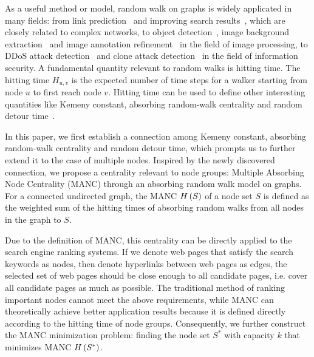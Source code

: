 \documentclass[sigconf]{acmart}
\begin{document}
As a useful method or model, random walk on graphs is widely applicated in many fields: from link prediction~\cite{YiGuWeTiHa10} and improving search results~\cite{LiPeMaQiWeQi10}, which are closely related to complex networks, to object detection~\cite{GoViHuRa10}, image background extraction~\cite{HuWaYeChLa16} and image annotation refinement~\cite{WaJiZhZh10} in the field of image processing, to DDoS attack detection~\cite{XuZhXiYu14} and clone attack detection~\cite{ZeCaZhGuXi10} in the field of information security.
A fundamental quantity relevant to random walks is hitting time.
The hitting time \(H_{u,v}\) is the expected number of time steps for a walker starting from node \(u\) to first reach node \(v\).
Hitting time can be used to define other interesting quantities like Kemeny constant, absorbing random-walk centrality and random detour time~\cite{RaZh13}.

In this paper, we first establish a connection among Kemeny constant, absorbing random-walk centrality and random detour time, which prompts us to further extend it to the case of multiple nodes.
Inspired by the newly discovered connection, we propose a centrality relevant to node groups: Multiple Absorbing Node Centrality (MANC) through an absorbing random walk model on graphs.
For a connected undirected graph, the MANC \(H\left(S\right)\) of a node set \(S\) is defined as the weighted sum of the hitting times of absorbing random walks from all nodes in the graph to \(S\).

Due to the definition of MANC, this centrality can be directly applied to the search engine ranking systems.
If we denote web pages that satisfy the search keywords as nodes, then denote hyperlinks between web pages as edges, the selected set of web pages should be close enough to all candidate pages, i.e. cover all candidate pages as much as possible.
The traditional method of ranking important nodes cannot meet the above requirements, while MANC can theoretically achieve better application results because it is defined directly according to the hitting time of node groups.
Consequently, we further construct the MANC minimization problem: finding the node set \(S^*\) with capacity \(k\) that minimizes MANC \(H\left(S^*\right)\).
\end{document}
